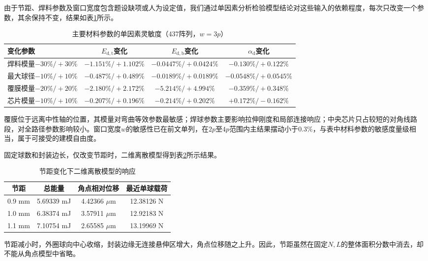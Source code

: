 \documentclass[draft,12pt,a4paper]{ctexart}
\theoremstyle{definition}
\begin{document}
由于节距、焊料参数及窗口宽度包含题设缺项或人为设定值，我们通过单因素分析检验模型结论对这些输入的依赖程度，每次只改变一个参数，其余保持不变，结果如表\ref{tab:q3-sens}所示。

\begin{table}[H]\centering
  \caption{主要材料参数的单因素灵敏度（437阵列，$w=3p$）}\label{tab:q3-sens}
  \small
  \begin{tabular}{lccc}
    \toprule
    \textbf{变化参数} & $E_{\mathrm{d,t}}$变化 & $E_{\mathrm{d,b}}$变化 & $\alpha_{\mathrm d}$变化 \\
    \midrule
    焊料模量$-30\%/+30\%$ & $-1.151\%/+1.102\%$ & $-0.0447\%/+0.0424\%$ & $-0.130\%/+0.122\%$ \\
    最大球径$-10\%/+10\%$ & $-0.487\%/+0.489\%$ & $-0.0189\%/+0.0189\%$ & $-0.0548\%/+0.0545\%$ \\
    覆膜模量$-20\%/+20\%$ & $-2.180\%/+2.172\%$ & $-5.214\%/+4.994\%$ & $-0.359\%/+0.348\%$ \\
    芯片模量$-10\%/+10\%$ & $-0.207\%/+0.196\%$ & $-0.214\%/+0.202\%$ & $+0.172\%/-0.162\%$ \\
    \bottomrule
  \end{tabular}
\end{table}

覆膜位于远离中性轴的位置，其模量对弯曲等效参数最敏感；焊球参数主要影响拉伸刚度和局部连接响应；中央芯片只占较短的对角线路段，对全路径参数影响较小。窗口宽度$w$的敏感性已在前文单列，在$2p$至$4p$范围内主结果摆动小于$0.3\%$，与表中材料参数的敏感度量级相当，属于可接受的建模自由度。

固定球数和封装边长，仅改变节距时，二维离散模型得到表\ref{tab:q3-pitch}所示结果。

\begin{table}[H]\centering
  \caption{节距变化下二维离散模型的响应}\label{tab:q3-pitch}
  \small
  \begin{tabular}{cccc}
    \toprule
    \textbf{节距} & \textbf{总能量} & \textbf{角点相对位移} & \textbf{最近单球载荷} \\
    \midrule
    0.9 mm & 5.69339 mJ & 4.42366 $\mu$m & 12.38126 N \\
    1.0 mm & 6.38374 mJ & 3.57911 $\mu$m & 12.92183 N \\
    1.1 mm & 7.10754 mJ & 2.65585 $\mu$m & 13.19969 N \\
    \bottomrule
  \end{tabular}
\end{table}

节距减小时，外圈球向中心收缩，封装边缘无连接悬伸区增大，角点位移随之上升。因此，节距虽然在固定$N,L$的整体面积分数中消去，却不能从角点模型中省略。
\end{document}
